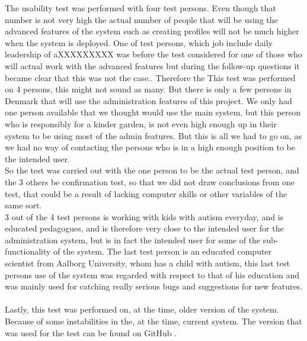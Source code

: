 The usability test was performed with four test persons. Even though that number is not very high the actual number of people that will be using the advanced features of the system such as creating profiles will not be much higher when the system is deployed. One of test persons, which job include daily leadership of aXXXXXXXXX was before the test considered for one of those who will actual work with the advanced features but during the follow-up questions it became clear that this was not the case.. Therefore the 
This test was performed on 4 persons, this might not sound as many. But there is only a few persons in Denmark that will use the administration features of this project. We only had one person available that we thought would use the main system, but this person who is responsibly for a kinder garden, is not even high enough up in their system to be using most of the admin features. But this is all we had to go on, as we had no way of contacting the persons who is in a high enough position to be the intended user.\\
So the test was carried out with the one person to be the actual test person, and the 3 others be confirmation test, so that we did not draw conclusions from one test, that could be a result of lacking computer skills or other variables of the same sort.\\
3 out of the 4 test persons is working with kids with autism everyday, and is educated pedagogues, and is therefore very close to the intended user for the administration system, but is in fact the intended user for some of the sub-functionality of the system. The last test person is an educated computer scientist from Aalborg University, whom has a child with autism, this last test persons use of the system was regarded with respect to that of his education and was mainly used for catching really serious bugs and suggestions for new features.\\
\\

Lastly, this test was performed on, at the time, older version of the system. Because of some instabilities in the, at the time, current system. The version that was used for the test can be found on GitHub \citep{testBranch}.\\
\\

